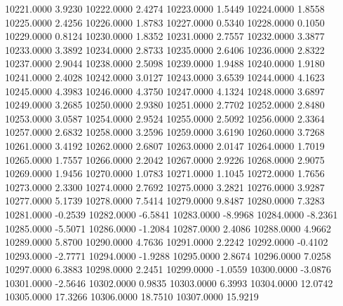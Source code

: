 10221.0000      3.9230
10222.0000      2.4274
10223.0000      1.5449
10224.0000      1.8558
10225.0000      2.4256
10226.0000      1.8783
10227.0000      0.5340
10228.0000      0.1050
10229.0000      0.8124
10230.0000      1.8352
10231.0000      2.7557
10232.0000      3.3877
10233.0000      3.3892
10234.0000      2.8733
10235.0000      2.6406
10236.0000      2.8322
10237.0000      2.9044
10238.0000      2.5098
10239.0000      1.9488
10240.0000      1.9180
10241.0000      2.4028
10242.0000      3.0127
10243.0000      3.6539
10244.0000      4.1623
10245.0000      4.3983
10246.0000      4.3750
10247.0000      4.1324
10248.0000      3.6897
10249.0000      3.2685
10250.0000      2.9380
10251.0000      2.7702
10252.0000      2.8480
10253.0000      3.0587
10254.0000      2.9524
10255.0000      2.5092
10256.0000      2.3364
10257.0000      2.6832
10258.0000      3.2596
10259.0000      3.6190
10260.0000      3.7268
10261.0000      3.4192
10262.0000      2.6807
10263.0000      2.0147
10264.0000      1.7019
10265.0000      1.7557
10266.0000      2.2042
10267.0000      2.9226
10268.0000      2.9075
10269.0000      1.9456
10270.0000      1.0783
10271.0000      1.1045
10272.0000      1.7656
10273.0000      2.3300
10274.0000      2.7692
10275.0000      3.2821
10276.0000      3.9287
10277.0000      5.1739
10278.0000      7.5414
10279.0000      9.8487
10280.0000      7.3283
10281.0000     -0.2539
10282.0000     -6.5841
10283.0000     -8.9968
10284.0000     -8.2361
10285.0000     -5.5071
10286.0000     -1.2084
10287.0000      2.4086
10288.0000      4.9662
10289.0000      5.8700
10290.0000      4.7636
10291.0000      2.2242
10292.0000     -0.4102
10293.0000     -2.7771
10294.0000     -1.9288
10295.0000      2.8674
10296.0000      7.0258
10297.0000      6.3883
10298.0000      2.2451
10299.0000     -1.0559
10300.0000     -3.0876
10301.0000     -2.5646
10302.0000      0.9835
10303.0000      6.3993
10304.0000     12.0742
10305.0000     17.3266
10306.0000     18.7510
10307.0000     15.9219
